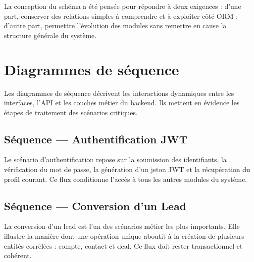 La conception du schéma a été pensée pour répondre à deux exigences : d'une part, conserver des relations simples à comprendre et à exploiter côté ORM ; d'autre part, permettre l'évolution des modules sans remettre en cause la structure générale du système.


\section{Diagrammes de séquence}
Les diagrammes de séquence décrivent les interactions dynamiques entre les interfaces, l'API et les couches métier du backend. Ils mettent en évidence les étapes de traitement des scénarios critiques.

\subsection{Séquence --- Authentification JWT}
Le scénario d'authentification repose sur la soumission des identifiants, la vérification du mot de passe, la génération d'un jeton JWT et la récupération du profil courant. Ce flux conditionne l'accès à tous les autres modules du système.


\subsection{Séquence --- Conversion d'un Lead}
La conversion d'un lead est l'un des scénarios métier les plus importants. Elle illustre la manière dont une opération unique aboutit à la création de plusieurs entités corrélées : compte, contact et deal. Ce flux doit rester transactionnel et cohérent.


